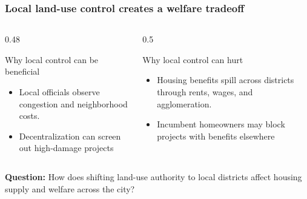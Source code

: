 
\begin{frame}[t]
    \frametitle{Local land-use control creates a welfare tradeoff}
    \small

    \begin{columns}[T,totalwidth=\textwidth]
        \begin{column}{0.48\textwidth}
            \begin{block}{Why local control can be beneficial}
                \begin{itemize}
                    \item Local officials observe congestion and neighborhood costs.
                    \item Decentralization can screen out high-damage projects \cite{jacobs_life_1961}
                \end{itemize}
            \end{block}
        \end{column}
        \begin{column}{0.5\textwidth}
            \begin{block}{Why local control can hurt}
                \begin{itemize}
                    \item Housing benefits spill across districts through rents, wages, and agglomeration.
                    \item Incumbent homeowners may block projects with benefits elsewhere
                \end{itemize}
            \end{block}
        \end{column}
    \end{columns}

    \vspace{0.02em}
    \begin{center}
        \begin{minipage}{0.88\textwidth}
            \centering
            \textbf{Question:} How does shifting land-use authority to local districts affect housing supply and welfare across the city?
        \end{minipage}
    \end{center}


\end{frame}
